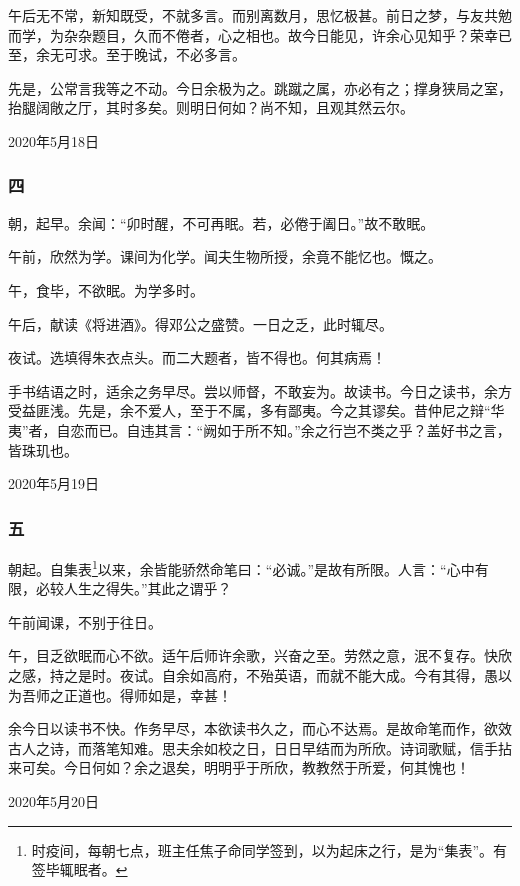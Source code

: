 \documentclass[a5paper]{ctexart}
\begin{document}
	午后无不常，新知既受，不就多言。而别离数月，思忆极甚。前日之梦，与友共勉而学，为杂杂题目，久而不倦者，心之相也。故今日能见，许余心见知乎？荣幸已至，余无可求。至于晚试，不必多言。
	
	先是，公常言我等之不动。今日余极为之。跳蹴之属，亦必有之；撑身狭局之室，抬腿阔敞之厅，其时多矣。则明日何如？尚不知，且观其然云尔。
	\begin{flushright}
		2020年5月18日
	\end{flushright}
	
	\subsubsection{四}
	朝，起早。余闻：“卯时醒，不可再眠。若，必倦于阖日。”故不敢眠。
	
	午前，欣然为学。课间为化学。闻夫生物所授，余竟不能忆也。慨之。
	
	午，食毕，不欲眠。为学多时。
	
	午后，献读《将进酒》。得邓公之盛赞。一日之乏，此时辄尽。
	
	夜试。选填得朱衣点头。而二大题者，皆不得也。何其病焉！
	
	手书结语之时，适余之务早尽。尝以师督，不敢妄为。故读书。今日之读书，余方受益匪浅。先是，余不爱人，至于不属，多有鄙夷。今之其谬矣。昔仲尼之辩“华夷”者，自恋而已。自违其言：“阙如于所不知。”余之行岂不类之乎？盖好书之言，皆珠玑也。
	\begin{flushright}
		2020年5月19日
	\end{flushright}
	
	\subsubsection{五}
	朝起。自集表\footnote{时疫间，每朝七点，班主任焦子命同学签到，以为起床之行，是为“集表”。有签毕辄眠者。}以来，余皆能骄然命笔曰：“必诚。”是故有所限。人言：“心中有限，必较人生之得失。”其此之谓乎？
	
	午前闻课，不别于往日。
	
	午，目乏欲眠而心不欲。适午后师许余歌，兴奋之至。劳然之意，泯不复存。快欣之感，持之是时。夜试。自余如高府，不殆英语，而就不能大成。今有其得，愚以为吾师之正道也。得师如是，幸甚！
	
	余今日以读书不快。作务早尽，本欲读书久之，而心不达焉。是故命笔而作，欲效古人之诗，而落笔知难。思夫余如校之日，日日早结而为所欣。诗词歌赋，信手拈来可矣。今日何如？余之退矣，明明乎于所欣，教教然于所爱，何其愧也！
	\begin{flushright}
		2020年5月20日
	\end{flushright}
	
\end{document}
